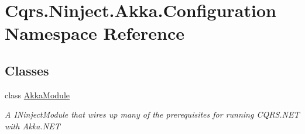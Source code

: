 \hypertarget{namespaceCqrs_1_1Ninject_1_1Akka_1_1Configuration}{}\section{Cqrs.\+Ninject.\+Akka.\+Configuration Namespace Reference}
\label{namespaceCqrs_1_1Ninject_1_1Akka_1_1Configuration}
\subsection*{Classes}
\begin{DoxyCompactItemize}
\item 
class \hyperlink{classCqrs_1_1Ninject_1_1Akka_1_1Configuration_1_1AkkaModule}{Akka\+Module}
\begin{DoxyCompactList}\small\item\em A I\+Ninject\+Module that wires up many of the prerequisites for running C\+Q\+R\+S.\+N\+ET with Akka.\+N\+ET \end{DoxyCompactList}\end{DoxyCompactItemize}
